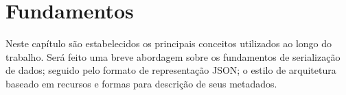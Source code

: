 \chapter{Fundamentos}

Neste capítulo são estabelecidos os principais conceitos utilizados ao longo do trabalho. Será feito uma breve abordagem sobre os fundamentos de serialização de dados; seguido pelo formato de representação JSON; o estilo de arquitetura baseado em recursos e formas para descrição de seus metadados.






